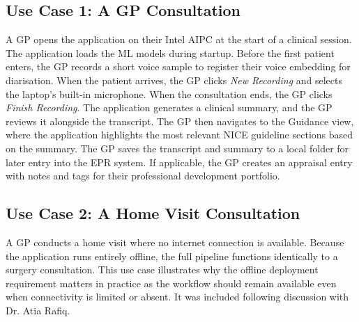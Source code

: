 \subsection{Use Case 1: A GP Consultation}
A GP opens the application on their Intel AIPC at the start of a clinical session. The application loads the ML models during startup. Before the first patient enters, the GP records a short voice sample to register their voice embedding for diarisation. When the patient arrives, the GP clicks \textit{New Recording} and selects the laptop's built-in microphone. When the consultation ends, the GP clicks \textit{Finish Recording}. The application generates a clinical summary, and the GP reviews it alongside the transcript. The GP then navigates to the Guidance view, where the application highlights the most relevant NICE guideline sections based on the summary. The GP saves the transcript and summary to a local folder for later entry into the EPR system. If applicable, the GP creates an appraisal entry with notes and tags for their professional development portfolio.

\subsection{Use Case 2: A Home Visit Consultation}
A GP conducts a home visit where no internet connection is available. Because the application runs entirely offline, the full pipeline functions identically to a surgery consultation. This use case illustrates why the offline deployment requirement matters in practice as the workflow should remain available even when connectivity is limited or absent. It was included following discussion with Dr. Atia Rafiq.